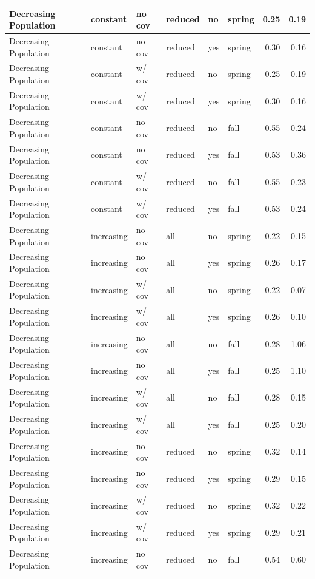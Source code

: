 \documentclass[
]{article}
\begin{document}
\begin{tabular}{l|l|l|l|l|l|r|r}
\hline
Decreasing Population & constant & no cov & reduced & no & spring & 0.25 & 0.19\\
\hline
Decreasing Population & constant & no cov & reduced & yes & spring & 0.30 & 0.16\\
\hline
Decreasing Population & constant & w/ cov & reduced & no & spring & 0.25 & 0.19\\
\hline
Decreasing Population & constant & w/ cov & reduced & yes & spring & 0.30 & 0.16\\
\hline
Decreasing Population & constant & no cov & reduced & no & fall & 0.55 & 0.24\\
\hline
Decreasing Population & constant & no cov & reduced & yes & fall & 0.53 & 0.36\\
\hline
Decreasing Population & constant & w/ cov & reduced & no & fall & 0.55 & 0.23\\
\hline
Decreasing Population & constant & w/ cov & reduced & yes & fall & 0.53 & 0.24\\
\hline
Decreasing Population & increasing & no cov & all & no & spring & 0.22 & 0.15\\
\hline
Decreasing Population & increasing & no cov & all & yes & spring & 0.26 & 0.17\\
\hline
Decreasing Population & increasing & w/ cov & all & no & spring & 0.22 & 0.07\\
\hline
Decreasing Population & increasing & w/ cov & all & yes & spring & 0.26 & 0.10\\
\hline
Decreasing Population & increasing & no cov & all & no & fall & 0.28 & 1.06\\
\hline
Decreasing Population & increasing & no cov & all & yes & fall & 0.25 & 1.10\\
\hline
Decreasing Population & increasing & w/ cov & all & no & fall & 0.28 & 0.15\\
\hline
Decreasing Population & increasing & w/ cov & all & yes & fall & 0.25 & 0.20\\
\hline
Decreasing Population & increasing & no cov & reduced & no & spring & 0.32 & 0.14\\
\hline
Decreasing Population & increasing & no cov & reduced & yes & spring & 0.29 & 0.15\\
\hline
Decreasing Population & increasing & w/ cov & reduced & no & spring & 0.32 & 0.22\\
\hline
Decreasing Population & increasing & w/ cov & reduced & yes & spring & 0.29 & 0.21\\
\hline
Decreasing Population & increasing & no cov & reduced & no & fall & 0.54 & 0.60\\

\end{tabular}
\end{document}
